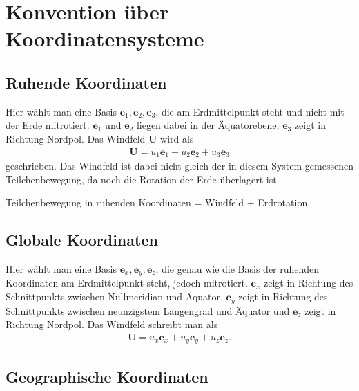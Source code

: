 \documentclass{book}
\begin{document}
\section{Konvention über Koordinatensysteme}
\label{sec:konvention_ueber_koordinatensysteme}

\subsection{Ruhende Koordinaten}
\label{sec:ruhende_koordinaten}

Hier wählt man eine Basis $\mathbf{e}_1, \mathbf{e}_2, \mathbf{e}_3$, die am Erdmittelpunkt steht und nicht mit der Erde mitrotiert. $\mathbf{e}_1$ und $\mathbf{e}_2$ liegen dabei in der Äquatorebene, $\mathbf{e}_3$ zeigt in Richtung Nordpol. Das Windfeld $\mathbf{U}$ wird als
%
\begin{eqnarray}
\mathbf{U} = u_1\mathbf{e}_1 + u_2\mathbf{e}_2 + u_3\mathbf{e}_3
\end{eqnarray}
%
geschrieben. Das Windfeld ist dabei nicht gleich der in diesem System gemessenen Teilchenbewegung, da noch die Rotation der Erde überlagert ist.
%
\begin{center}
Teilchenbewegung in ruhenden Koordinaten = Windfeld + Erdrotation
\end{center}
%
\subsection{Globale Koordinaten}
\label{sec:globale_koordinaten}

Hier wählt man eine Basis $\mathbf{e}_x, \mathbf{e}_y, \mathbf{e}_z$, die genau wie die Basis der ruhenden Koordinaten am Erdmittelpunkt steht, jedoch mitrotiert. $\mathbf{e}_x$ zeigt in Richtung des Schnittpunkts zwischen Nullmeridian und Äquator, $\mathbf{e}_y$ zeigt in Richtung des Schnittpunkts zwischen neunzigstem Längengrad und Äquator und $\mathbf{e}_z$ zeigt in Richtung Nordpol. Das Windfeld schreibt man als
%
\begin{eqnarray}
\mathbf{U} = u_x\mathbf{e}_x + u_y\mathbf{e}_y + u_z\mathbf{e}_z.
\end{eqnarray}
%
\subsection{Geographische Koordinaten}
\label{sec:geographische_koordinaten}
\end{document}
